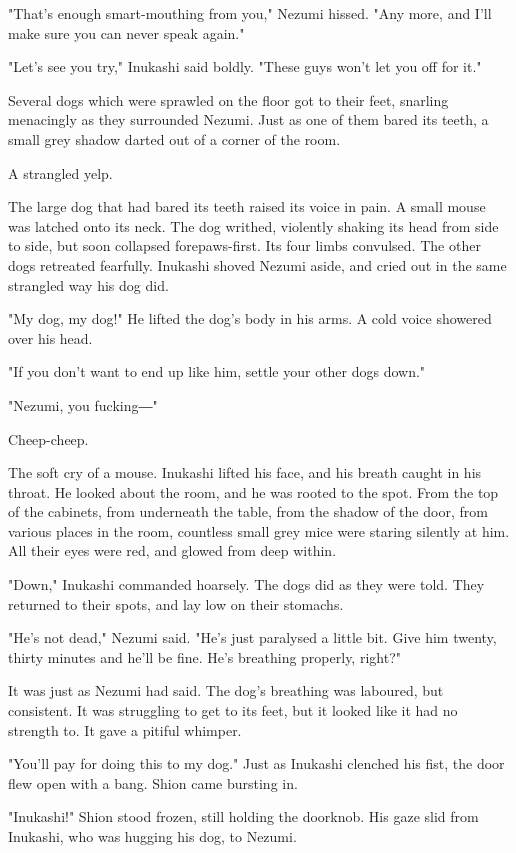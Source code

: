 "That's enough smart-mouthing from you," Nezumi hissed. "Any more, and
I'll make sure you can never speak again."

"Let's see you try," Inukashi said boldly. "These guys won't let you off
for it."

Several dogs which were sprawled on the floor got to their feet,
snarling menacingly as they surrounded Nezumi. Just as one of them bared
its teeth, a small grey shadow darted out of a corner of the room.

A strangled yelp.

The large dog that had bared its teeth raised its voice in pain. A small
mouse was latched onto its neck. The dog writhed, violently shaking its
head from side to side, but soon collapsed forepaws-first. Its four
limbs convulsed. The other dogs retreated fearfully. Inukashi shoved
Nezumi aside, and cried out in the same strangled way his dog did.

"My dog, my dog!" He lifted the dog's body in his arms. A cold voice
showered over his head.

"If you don't want to end up like him, settle your other dogs down."

"Nezumi, you fucking―"

Cheep-cheep.

The soft cry of a mouse. Inukashi lifted his face, and his breath caught
in his throat. He looked about the room, and he was rooted to the spot.
From the top of the cabinets, from underneath the table, from the shadow
of the door, from various places in the room, countless small grey mice
were staring silently at him. All their eyes were red, and glowed from
deep within.

"Down," Inukashi commanded hoarsely. The dogs did as they were told.
They returned to their spots, and lay low on their stomachs.

"He's not dead," Nezumi said. "He's just paralysed a little bit. Give
him twenty, thirty minutes and he'll be fine. He's breathing properly,
right?"

It was just as Nezumi had said. The dog's breathing was laboured, but
consistent. It was struggling to get to its feet, but it looked like it
had no strength to. It gave a pitiful whimper.

"You'll pay for doing this to my dog." Just as Inukashi clenched his
fist, the door flew open with a bang. Shion came bursting in.

"Inukashi!" Shion stood frozen, still holding the doorknob. His gaze
slid from Inukashi, who was hugging his dog, to Nezumi.

